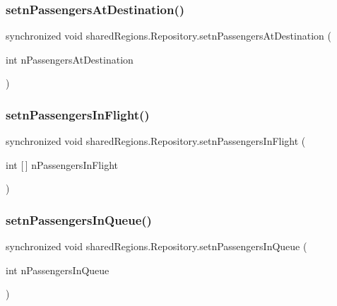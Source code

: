 \subsubsection{\texorpdfstring{setn\+Passengers\+At\+Destination()}{setnPassengersAtDestination()}}
{\footnotesize\ttfamily synchronized void shared\+Regions.\+Repository.\+setn\+Passengers\+At\+Destination (\begin{DoxyParamCaption}\item[{int}]{n\+Passengers\+At\+Destination }\end{DoxyParamCaption})}

\mbox{\label{classshared_regions_1_1_repository_aea740a0c5225eaffb757bf31f690985d}} 
\subsubsection{\texorpdfstring{setn\+Passengers\+In\+Flight()}{setnPassengersInFlight()}}
{\footnotesize\ttfamily synchronized void shared\+Regions.\+Repository.\+setn\+Passengers\+In\+Flight (\begin{DoxyParamCaption}\item[{int \mbox{[}$\,$\mbox{]}}]{n\+Passengers\+In\+Flight }\end{DoxyParamCaption})}

\mbox{\label{classshared_regions_1_1_repository_afcbe0092a2ca34a1f8c13cd4d37a7bde}} 
\subsubsection{\texorpdfstring{setn\+Passengers\+In\+Queue()}{setnPassengersInQueue()}}
{\footnotesize\ttfamily synchronized void shared\+Regions.\+Repository.\+setn\+Passengers\+In\+Queue (\begin{DoxyParamCaption}\item[{int}]{n\+Passengers\+In\+Queue }\end{DoxyParamCaption})}

